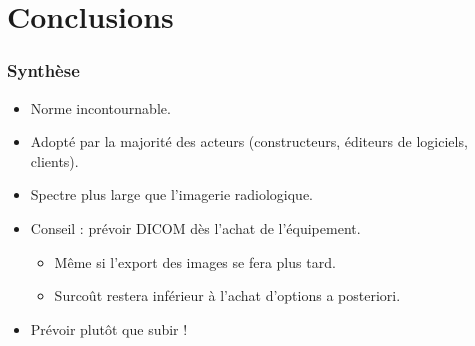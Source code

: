 \section{Conclusions}

\frame
{
	\frametitle{Synth\`ese}
	
	\begin{itemize}
		\item Norme incontournable.
		\item Adopt\'e par la majorit\'e des acteurs (constructeurs, \'editeurs de logiciels, clients).
		\item Spectre plus large que l'imagerie radiologique.
		\item Conseil : pr\'evoir DICOM d\`es l'achat de l'\'equipement.
		\begin{itemize}
			\item M\^eme si l'export des images se fera plus tard.
			\item Surco\^ut restera inf\'erieur \`a l'achat d'options a posteriori.
		\end{itemize}
		\item Pr\'evoir plut\^ot que subir !
	\end{itemize}
}
